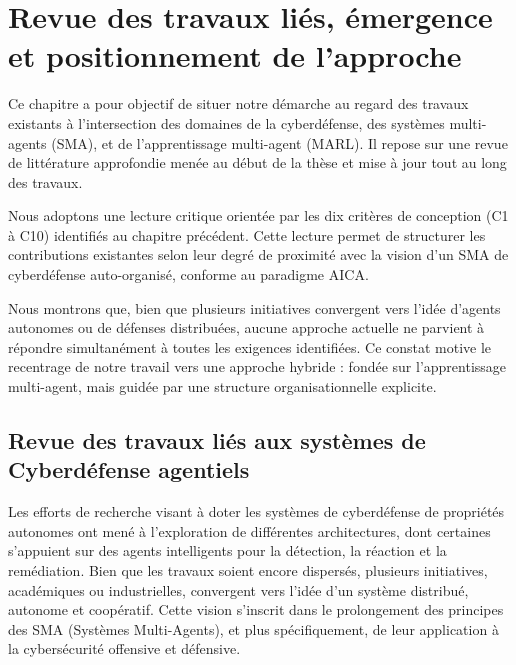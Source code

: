 \documentclass[ twoside,openright,titlepage,numbers=noenddot,headinclude,%
                footinclude=true,cleardoublepage=empty,abstractoff, %
                BCOR=5mm,paper=a4,fontsize=11pt,%
                french,american,%
                ]{scrreprt}
\begin{document}
\chapter{Revue des travaux liés, émergence et positionnement de l'approche}

\noindent
Ce chapitre a pour objectif de situer notre démarche au regard des travaux existants à l'intersection des domaines de la cyberdéfense, des systèmes multi-agents (SMA), et de l'apprentissage multi-agent (MARL). Il repose sur une revue de littérature approfondie menée au début de la thèse et mise à jour tout au long des travaux.

Nous adoptons une lecture critique orientée par les dix critères de conception (C1 à C10) identifiés au chapitre précédent. Cette lecture permet de structurer les contributions existantes selon leur degré de proximité avec la vision d'un SMA de cyberdéfense auto-organisé, conforme au paradigme AICA.

Nous montrons que, bien que plusieurs initiatives convergent vers l'idée d'agents autonomes ou de défenses distribuées, aucune approche actuelle ne parvient à répondre simultanément à toutes les exigences identifiées. Ce constat motive le recentrage de notre travail vers une approche hybride : fondée sur l'apprentissage multi-agent, mais guidée par une structure organisationnelle explicite.

\section{Revue des travaux liés aux systèmes de Cyberdéfense agentiels}\label{sec:revue-cyberdef-agent}

Les efforts de recherche visant à doter les systèmes de cyberdéfense de propriétés autonomes ont mené à l'exploration de différentes architectures, dont certaines s'appuient sur des agents intelligents pour la détection, la réaction et la remédiation. Bien que les travaux soient encore dispersés, plusieurs initiatives, académiques ou industrielles, convergent vers l'idée d'un système distribué, autonome et coopératif. Cette vision s'inscrit dans le prolongement des principes des SMA (Systèmes Multi-Agents), et plus spécifiquement, de leur application à la cybersécurité offensive et défensive.
\end{document}
